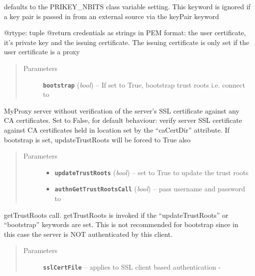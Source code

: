\documentclass[letterpaper,10pt,english]{sphinxmanual}
\begin{document}
\begin{fulllineitems}
\begin{fulllineitems}
defaults to the PRIKEY\_NBITS class variable setting.  This keyword is
ignored if a key pair is passed in from an external source via the
keyPair keyword

@rtype: tuple
@return credentials as strings in PEM format: the
user certificate, it's private key and the issuing certificate.  The
issuing certificate is only set if the user certificate is a proxy
\begin{quote}\begin{description}
\item[{Parameters}] \leavevmode
\textbf{\texttt{bootstrap}} (\emph{bool}) -- If set to True, bootstrap trust roots i.e. connect to

\end{description}\end{quote}

MyProxy server without verification of the server's SSL certificate
against any CA certificates.  Set to False, for default behaviour:
verify server SSL certificate against CA certificates held in location
set by the ``caCertDir'' attribute.  If bootstrap is set, updateTrustRoots
will be forced to True also
\begin{quote}\begin{description}
\item[{Parameters}] \leavevmode\begin{itemize}
\item {} 
\textbf{\texttt{updateTrustRoots}} (\emph{bool}) -- set to True to update the trust roots

\item {} 
\textbf{\texttt{authnGetTrustRootsCall}} (\emph{bool}) -- pass username and password to

\end{itemize}

\end{description}\end{quote}

getTrustRoots call.  getTrustRoots is invoked if the ``updateTrustRoots''
or ``bootstrap'' keywords are set.  This is not recommended for 
bootstrap since in this case the server is NOT authenticated by this 
client.
\begin{quote}\begin{description}
\item[{Parameters}] \leavevmode
\textbf{\texttt{sslCertFile}} -- applies to SSL client based authentication -

\end{description}\end{quote}


\end{fulllineitems}
\end{fulllineitems}
\end{document}
